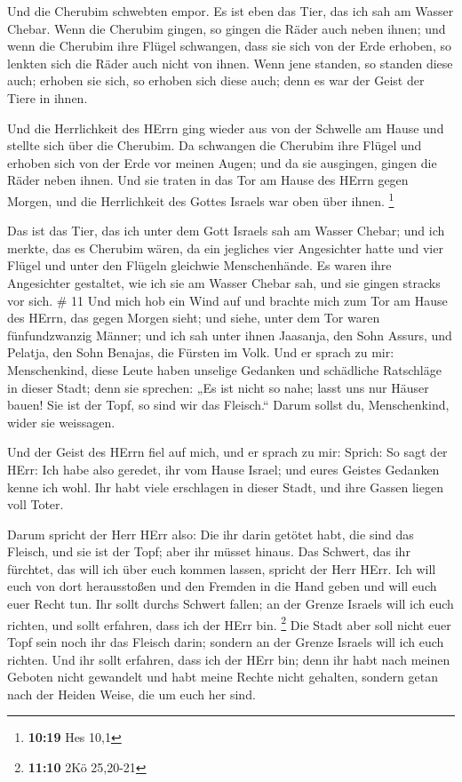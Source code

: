  Und die Cherubim schwebten empor. Es ist eben das Tier,
das ich sah am Wasser Chebar.  Wenn die Cherubim gingen, so
gingen die Räder auch neben ihnen; und wenn die Cherubim ihre Flügel
schwangen, dass sie sich von der Erde erhoben, so lenkten sich die Räder
auch nicht von ihnen.  Wenn jene standen, so standen diese
auch; erhoben sie sich, so erhoben sich diese auch; denn es war der
Geist der Tiere in ihnen.

 Und die Herrlichkeit des HErrn ging wieder aus von der
Schwelle am Hause und stellte sich über die Cherubim.  Da
schwangen die Cherubim ihre Flügel und erhoben sich von der Erde vor
meinen Augen; und da sie ausgingen, gingen die Räder neben ihnen. Und
sie traten in das Tor am Hause des HErrn gegen Morgen, und die
Herrlichkeit des Gottes Israels war oben über ihnen. \footnote{\textbf{10:19}
  Hes 10,1}

 Das ist das Tier, das ich unter dem Gott Israels sah am
Wasser Chebar; und ich merkte, das es Cherubim wären,  da
ein jegliches vier Angesichter hatte und vier Flügel und unter den
Flügeln gleichwie Menschenhände.  Es waren ihre Angesichter
gestaltet, wie ich sie am Wasser Chebar sah, und sie gingen stracks vor
sich. \# 11  Und mich hob ein Wind auf und brachte mich zum
Tor am Hause des HErrn, das gegen Morgen sieht; und siehe, unter dem Tor
waren fünfundzwanzig Männer; und ich sah unter ihnen Jaasanja, den Sohn
Assurs, und Pelatja, den Sohn Benajas, die Fürsten im Volk. 
Und er sprach zu mir: Menschenkind, diese Leute haben unselige Gedanken
und schädliche Ratschläge in dieser Stadt;  denn sie
sprechen: „Es ist nicht so nahe; lasst uns nur Häuser bauen! Sie ist der
Topf, so sind wir das Fleisch.``  Darum sollst du,
Menschenkind, wider sie weissagen.

 Und der Geist des HErrn fiel auf mich, und er sprach zu
mir: Sprich: So sagt der HErr: Ich habe also geredet, ihr vom Hause
Israel; und eures Geistes Gedanken kenne ich wohl.  Ihr habt
viele erschlagen in dieser Stadt, und ihre Gassen liegen voll Toter.

 Darum spricht der Herr HErr also: Die ihr darin getötet
habt, die sind das Fleisch, und sie ist der Topf; aber ihr müsset
hinaus.  Das Schwert, das ihr fürchtet, das will ich über
euch kommen lassen, spricht der Herr HErr.  Ich will euch
von dort herausstoßen und den Fremden in die Hand geben und will euch
euer Recht tun.  Ihr sollt durchs Schwert fallen; an der
Grenze Israels will ich euch richten, und sollt erfahren, dass ich der
HErr bin. \footnote{\textbf{11:10} 2Kö 25,20-21}  Die Stadt
aber soll nicht euer Topf sein noch ihr das Fleisch darin; sondern an
der Grenze Israels will ich euch richten.  Und ihr sollt
erfahren, dass ich der HErr bin; denn ihr habt nach meinen Geboten nicht
gewandelt und habt meine Rechte nicht gehalten, sondern getan nach der
Heiden Weise, die um euch her sind.

